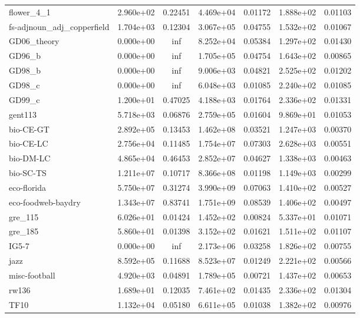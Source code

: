 \documentclass[senior,final,11pt]{iscs-thesis}
\begin{document}
\begin{table}[htb]
\begin{center}
{\begin{tabular}{l | c c | c c | c c }
        flower\_4\_1 & 2.960e+02 & 0.22451 & 4.469e+04 & 0.01172 & 1.888e+02 & 0.01103\\
        fs-adjnoun\_adj\_copperfield & 1.704e+03 & 0.12304 & 3.067e+05 & 0.04755 & 1.532e+02 & 0.01067\\
        GD06\_theory & 0.000e+00 & inf & 8.252e+04 & 0.05384 & 1.297e+02 & 0.01430\\
        GD96\_b & 0.000e+00 & inf & 1.705e+05 & 0.04754 & 1.643e+02 & 0.00865\\
        GD98\_b & 0.000e+00 & inf & 9.006e+03 & 0.04821 & 2.525e+02 & 0.01202\\
        GD98\_c & 0.000e+00 & inf & 6.048e+03 & 0.01085 & 2.240e+02 & 0.01085\\
        GD99\_c & 1.200e+01 & 0.47025 & 4.188e+03 & 0.01764 & 2.336e+02 & 0.01331\\
        gent113 & 5.718e+03 & 0.06876 & 2.759e+05 & 0.01604 & 9.869e+01 & 0.01053\\
        bio-CE-GT & 2.892e+05 & 0.13453 & 1.462e+08 & 0.03521 & 1.247e+03 & 0.00370\\
        bio-CE-LC & 2.756e+04 & 0.11485 & 1.754e+07 & 0.07303 & 2.628e+03 & 0.00551\\
        bio-DM-LC & 4.865e+04 & 0.46453 & 2.852e+07 & 0.04627 & 1.338e+03 & 0.00463\\
        bio-SC-TS & 1.211e+07 & 0.10717 & 8.366e+08 & 0.01198 & 1.149e+03 & 0.00299\\
        eco-florida & 5.750e+07 & 0.31274 & 3.990e+09 & 0.07063 & 1.410e+02 & 0.00527\\
        eco-foodweb-baydry & 1.343e+07 & 0.83741 & 1.751e+09 & 0.08539 & 1.406e+02 & 0.00497\\
        gre\_115 & 6.026e+01 & 0.01424 & 1.452e+02 & 0.00824 & 5.337e+01 & 0.01071\\
        gre\_185 & 5.860e+01 & 0.01398 & 3.152e+02 & 0.01621 & 1.511e+02 & 0.01107\\
        IG5-7 & 0.000e+00 & inf & 2.173e+06 & 0.03258 & 1.826e+02 & 0.00755\\
        jazz & 8.592e+05 & 0.11688 & 8.523e+07 & 0.01249 & 2.221e+02 & 0.00566\\
        misc-football & 4.920e+03 & 0.04891 & 1.789e+05 & 0.00721 & 1.437e+02 & 0.00653\\
        rw136 & 1.689e+01 & 0.12035 & 7.461e+02 & 0.01435 & 2.336e+02 & 0.01304\\
        TF10 & 1.132e+04 & 0.05180 & 6.611e+05 & 0.01038 & 1.382e+02 & 0.00976\\

\end{tabular}}
\end{center}
\end{table}
\end{document}
